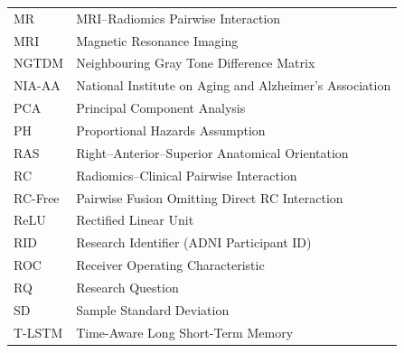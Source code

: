 {\begin{longtable}{@{}L{2.6cm}L{12.9cm}@{}}
MR & MRI--Radiomics Pairwise Interaction \\
MRI & Magnetic Resonance Imaging \\[0.8em]
NGTDM & Neighbouring Gray Tone Difference Matrix \\
NIA-AA & National Institute on Aging and Alzheimer's Association \\[0.8em]
PCA & Principal Component Analysis \\
PH & Proportional Hazards Assumption \\[0.8em]
RAS & Right--Anterior--Superior Anatomical Orientation \\
RC & Radiomics--Clinical Pairwise Interaction \\
RC-Free & Pairwise Fusion Omitting Direct RC Interaction \\
ReLU & Rectified Linear Unit \\
RID & Research Identifier (ADNI Participant ID) \\
ROC & Receiver Operating Characteristic \\
RQ & Research Question \\[0.8em]
SD & Sample Standard Deviation \\[0.8em]
T-LSTM & Time-Aware Long Short-Term Memory \\
\end{longtable}\par
}
